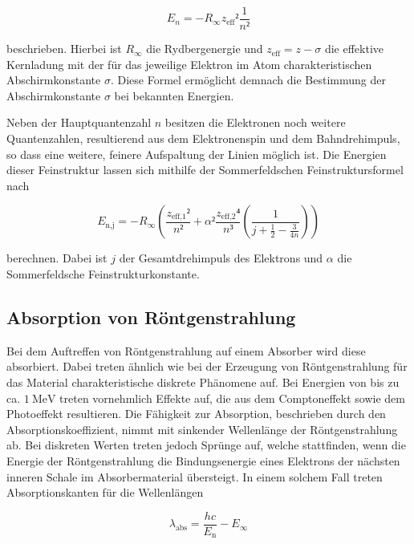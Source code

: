 \begin{equation}
E_n = -R_{\infty} z_\text{eff}² \frac{1}{n²}
\label{eqn:std}
\end{equation}

beschrieben. 
Hierbei ist $R_\infty$ die Rydbergenergie und $z_\text{eff} = z -\sigma$ die
effektive Kernladung mit der für das jeweilige Elektron im Atom charakteristischen
Abschirmkonstante $\sigma$.
Diese Formel ermöglicht demnach die Bestimmung der Abschirmkonstante $\sigma$
bei bekannten Energien. 

Neben der Hauptquantenzahl $n$ besitzen die Elektronen noch weitere Quantenzahlen,
resultierend aus dem Elektronenspin und dem Bahndrehimpuls, so dass eine weitere,
feinere Aufspaltung der Linien möglich ist. 
Die Energien dieser Feinstruktur lassen sich mithilfe der Sommerfeldschen 
Feinstruktursformel nach 

\begin{equation}
E_{\text{n},\text{j}} = -R_\infty \left( \frac{z_{\text{eff},\text{1}}²}{n²} + \alpha² \frac{z_{\text{eff},\text{2}}⁴}{n³}
\left(\frac{1}{j+\frac{1}{2} - \frac{3}{4n}}\right)\right)
\end{equation}

berechnen. Dabei ist $j$ der Gesamtdrehimpuls des Elektrons und $\alpha$ die 
Sommerfeldsche Feinstrukturkonstante. 

\subsection{Absorption von Röntgenstrahlung}

Bei dem Auftreffen von Röntgenstrahlung auf einem Absorber wird diese absorbiert. 
Dabei treten ähnlich wie bei der Erzeugung von Röntgenstrahlung für das Material
charakteristische diskrete Phänomene auf. 
Bei Energien von bis zu ca. $\SI{1}{\mega\electronvolt}$ treten vornehmlich 
Effekte auf, die aus dem Comptoneffekt sowie dem Photoeffekt resultieren. 
Die Fähigkeit zur Absorption, beschrieben durch den Absorptionskoeffizient, 
nimmt mit sinkender Wellenlänge der Röntgenstrahlung ab. 
Bei diskreten Werten treten jedoch Sprünge auf, welche stattfinden, wenn die Energie
der Röntgenstrahlung die Bindungsenergie eines Elektrons der nächsten inneren 
Schale im Absorbermaterial übersteigt. 
In einem solchem Fall treten Absorptionskanten für die Wellenlängen 

\begin{equation}
\lambda_\text{abs} = \frac{h c}{E_\text{n}} - E_\infty
\end{equation}

